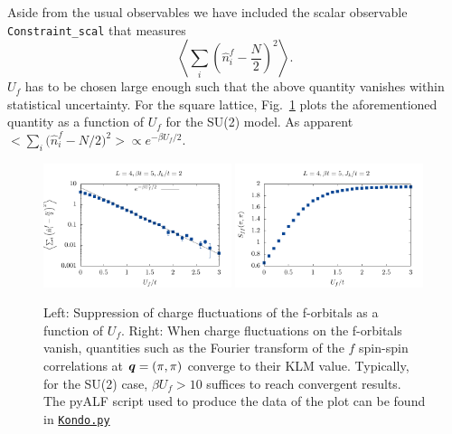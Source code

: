 Aside from the usual observables  we have included  the scalar observable \texttt{Constraint\_scal}    that measures 
\begin{equation}
	\left<    \sum_{i}   \left( \hat{n}_i^f - \frac{N}{2} \right)^2 \right>.
\end{equation}
$U_f$ has to be chosen large enough  such that  the above quantity vanishes within statistical uncertainty.  For the square lattice,  Fig.~\ref{Constraint.fig}   plots   the  aforementioned quantity as a function of $U_f$  for the SU(2) model.  As apparent $ \Big<    \sum_{i}   \big( \hat{n}_i^f - N/2 \big)^2 \Big> \propto e^{-\beta U_f/2} $.
\begin{figure}
\center
\includegraphics[width=0.49\textwidth]{Figures/Kondo/Constraint.pdf}
\includegraphics[width=0.49\textwidth]{Figures/Kondo/Spin.pdf}

\caption{Left:  Suppression of charge fluctuations of the f-orbitals as a function of $U_f$.  Right:   When  charge fluctuations  on the f-orbitals vanish, quantities such as the Fourier transform of the $f$ spin-spin  correlations at $\boldsymbol{q} = (\pi,\pi) $  converge to their KLM value. Typically,  for the SU(2) case, $\beta U_f > 10 $ suffices to reach convergent results.
The pyALF script used to produce the data of  the plot can be found in \href{https://git.physik.uni-wuerzburg.de/ALF/ALF/-/blob/master/Documentation/Figures/Kondo/Kondo.py}{\texttt{Kondo.py}}  }
        \label{Constraint.fig}
\end{figure}



